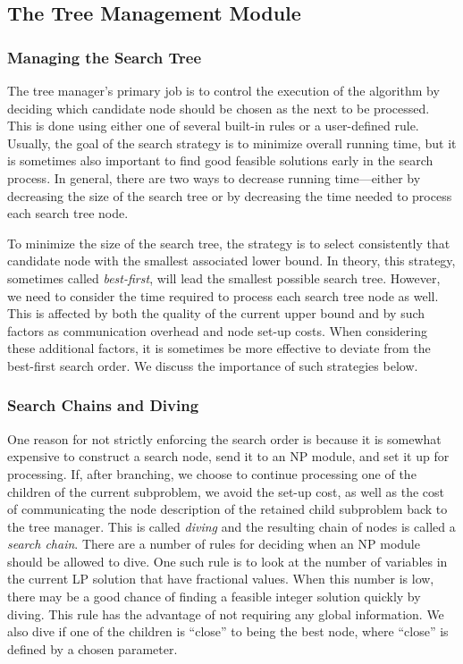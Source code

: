 \subsection{The Tree Management Module}
\label{tree-management}

\subsubsection{Managing the Search Tree}

The tree manager's primary job is to control the execution of the
algorithm by deciding which candidate node should be chosen as the
next to be processed. This is done using either one of several
built-in rules or a user-defined rule. Usually, the goal of the search
strategy is to minimize overall running time, but it is sometimes
also important to find good feasible solutions early in the search
process. In general, there are two ways to decrease running
time---either by decreasing the size of the search tree or by
decreasing the time needed to process each search tree node.

To minimize the size of the search tree, the strategy is to select
consistently that candidate node with the smallest associated lower bound.
In theory, this strategy, sometimes called {\em best-first}, will lead
the smallest possible search tree. However, we need to consider the
time required to process each search tree node as well. This is affected
by both the quality of the current upper bound and by such factors as
communication overhead and node set-up costs. When considering these
additional factors, it is sometimes be more effective to deviate from the
best-first search order. We discuss the importance of such strategies
below.

\subsubsection{Search Chains and Diving}

One reason for not strictly enforcing the search order is because it
is somewhat expensive to construct a search node, send it to an NP
module, and set it up for processing. If, after branching, we choose
to continue processing one of the children of the current subproblem,
we avoid the set-up cost, as well as the cost of communicating the
node description of the retained child subproblem back to the tree
manager. This is called {\em diving} and the resulting chain of nodes
is called a {\em search chain}. There are a number of rules for
deciding when an NP module should be allowed to dive. One such rule is
to look at the number of variables in the current LP solution that
have fractional values. When this number is low, there may be a good
chance of finding a feasible integer solution quickly by diving. This
rule has the advantage of not requiring any global information. We
also dive if one of the children is ``close'' to being the best node,
where ``close'' is defined by a chosen parameter.

